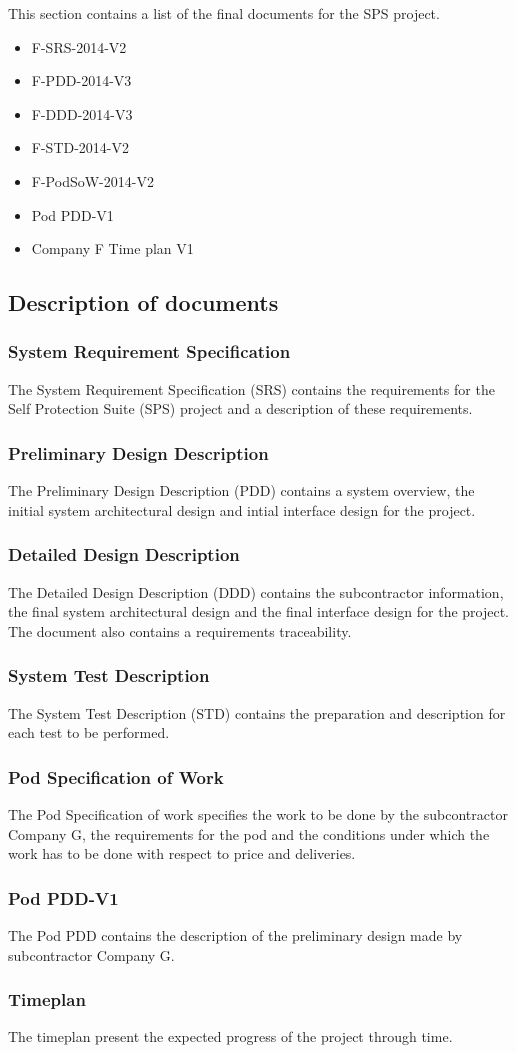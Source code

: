 This section contains a list of the final documents for the SPS project.\\
\begin{itemize}
\item F-SRS-2014-V2
\item F-PDD-2014-V3
\item F-DDD-2014-V3
\item F-STD-2014-V2
\item F-PodSoW-2014-V2
\item Pod PDD-V1
\item Company F Time plan V1\\
\end{itemize}

\subsection{Description of documents}
\subsubsection{System Requirement Specification}
The System Requirement Specification (SRS) contains the requirements for the Self Protection Suite (SPS) project and a description of these requirements.\\
\subsubsection{Preliminary Design Description}
The Preliminary Design Description (PDD) contains a system overview, the initial system architectural design and intial interface design for the project.\\
\subsubsection{Detailed Design Description}
The Detailed Design Description (DDD) contains the subcontractor information, the final system architectural design and the final interface design for the project. The document also contains a requirements traceability.\\
\subsubsection{System Test Description}
The System Test Description (STD) contains  the preparation and description for each test to be performed.\\
\newpage
\subsubsection{Pod Specification of Work}
The Pod Specification of work specifies the work to be done by the subcontractor Company G, the requirements for the pod and the conditions under which the work has to be done with respect to price and deliveries.
\subsubsection{Pod PDD-V1}
The Pod PDD contains the description of the preliminary design made by subcontractor Company G.
\subsubsection{Timeplan}
The timeplan present the expected progress of the project through time.
